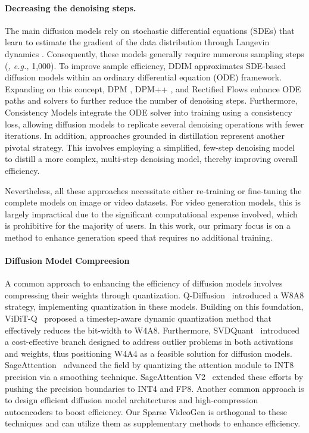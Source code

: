 \paragraph{Decreasing the denoising steps.} 
The main diffusion models rely on stochastic differential equations (SDEs) that learn to estimate the gradient of the data distribution through Langevin dynamics \citep{ho2020denoising, meng2022sdedit}. Consequently, these models generally require numerous sampling steps (\textit{, e.g.,} 1,000). To improve sample efficiency, DDIM \citep{song2020denoising} approximates SDE-based diffusion models within an ordinary differential equation (ODE) framework. Expanding on this concept, DPM \citep{lu2022dpm}, DPM++ \citep{lu2022dpm++}, and Rectified Flows \citep{liu2022flow, liu2023instaflow} enhance ODE paths and solvers to further reduce the number of denoising steps. Furthermore, Consistency Models \citep{song2023consistency, luo2023latent} integrate the ODE solver into training using a consistency loss, allowing diffusion models to replicate several denoising operations with fewer iterations. In addition, approaches grounded in distillation \citep{yin2024improved,yin2024one} represent another pivotal strategy. This involves employing a simplified, few-step denoising model to distill a more complex, multi-step denoising model, thereby improving overall efficiency.

Nevertheless, all these approaches necessitate either re-training or fine-tuning the complete models on image or video datasets. For video generation models, this is largely impractical due to the significant computational expense involved, which is prohibitive for the majority of users. In this work, our primary focus is on a method to enhance generation speed that requires no additional training.

\paragraph{Diffusion Model Compreesion}
A common approach to enhancing the efficiency of diffusion models involves compressing their weights through quantization. Q-Diffusion~\citep{li2023q} introduced a W8A8 strategy, implementing quantization in these models. Building on this foundation, ViDiT-Q~\citep{zhao2024vidit} proposed a timestep-aware dynamic quantization method that effectively reduces the bit-width to W4A8. Furthermore, SVDQuant~\citep{li2024svdquant} introduced a cost-effective branch designed to address outlier problems in both activations and weights, thus positioning W4A4 as a feasible solution for diffusion models. SageAttention~\citep{zhang2025sageattention} advanced the field by quantizing the attention module to INT8 precision via a smoothing technique. SageAttention V2~\citep{zhang2024sageattention2} extended these efforts by pushing the precision boundaries to INT4 and FP8. Another common approach is to design efficient diffusion model architectures \cite{xie2024sana,cai2024condition,chen2025pixart} and high-compression autoencoders \cite{chen2024deep} to boost efficiency. Our Sparse VideoGen is orthogonal to these techniques and can utilize them as supplementary methods to enhance efficiency.

